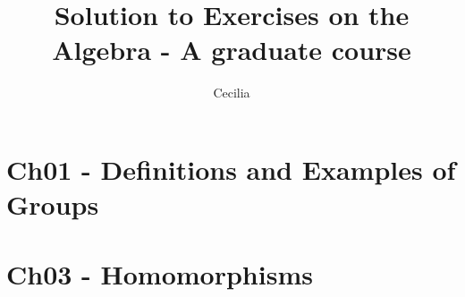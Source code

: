 \documentclass{article}
\title{Solution to Exercises on the \\Algebra - A graduate course}
\author{Cecilia}
\begin{document}
\maketitle

\section*{Ch01 - Definitions and Examples of Groups}

\section*{Ch03 - Homomorphisms}
\end{document}
